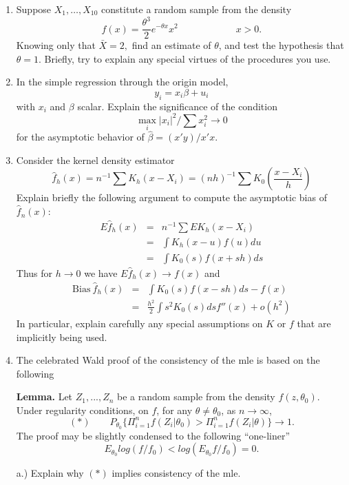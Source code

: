 \vspace{15mm}
\begin{enumerate}
\item Suppose $X_1, \dots , X_{10} $ constitute a random sample from 
the density 
\[
f(x) = \frac{\theta^3}{2} e^{-\theta x} x^2  \qquad \qquad \qquad x>0 .
\]
Knowing only that $\bar{X}=2,$ find an estimate of $\theta $, and test 
the hypothesis that $\theta = 1 .$  Briefly, try to explain any 
special virtues of the procedures you use.

\item In the simple regression through the origin model,
\[
y_i=x_i\beta + u_i
\]
with $x_i$ and $\beta $ scalar.  Explain the significance of the 
condition
\[
\max_i |x_i|^2 / \sum x_i^2 \rightarrow 0
\]
for the asymptotic behavior of $\hat{\beta} = (x'y)/x'x.$

\item Consider the kernel density estimator
\[
\hat{f}_h(x) = n^{-1} \sum K_h (x-X_i) = (nh)^{-1} \sum K_0 \left( 
\frac{x-X_i}{h} \right)
\]
Explain briefly the following argument to compute the asymptotic bias of 
$\hat{f}_n(x)$:
\begin{eqnarray*}
E\hat{f}_h(x) &=& n^{-1}\sum EK_h (x-X_i) \\
 & = & \int K_h (x-u)f(u) du \\
 &=& \int K_0 (s) f(x+sh)ds
\end{eqnarray*}
Thus for $h \rightarrow 0$ we have $E\hat{f}_h(x) \rightarrow f(x) $ and
\begin{eqnarray*}
\mbox{Bias} \: \hat{f}_h(x) &=& \int K_0(s)f(x-sh)ds - f(x) \\
&=& \frac{h^2}{2} \int s^2 K_0(s) ds f '' (x) + o(h^2) 
\end{eqnarray*}
In particular, explain carefully any special assumptions on $K$ or $f$
that are implicitly being used.
\item  The celebrated Wald proof of the consistency of the mle is based 
on the following

{\bf Lemma.}  Let $Z_1, ... , Z_n$ be a random sample from the density 
$f(z,\theta_0)$.  Under regularity conditions, on $f$, for any
$\theta \neq \theta_0$, as $n \to \infty$,
\[
(*) \qquad P_{\theta_0} \{ \Pi_{i=1}^n f(Z_i | \theta_0 ) > 
\Pi_{i=1}^n f(Z_i | \theta )\}  \to 1.
\]
The proof may be slightly condensed to the following ``one-liner''
\[
E_{\theta_0} log (f/f_0) < log (E_{\theta_0}  f/f_0 ) = 0.
\]

a.) Explain why $(*)$ implies consistency of the mle.


\end{enumerate}
